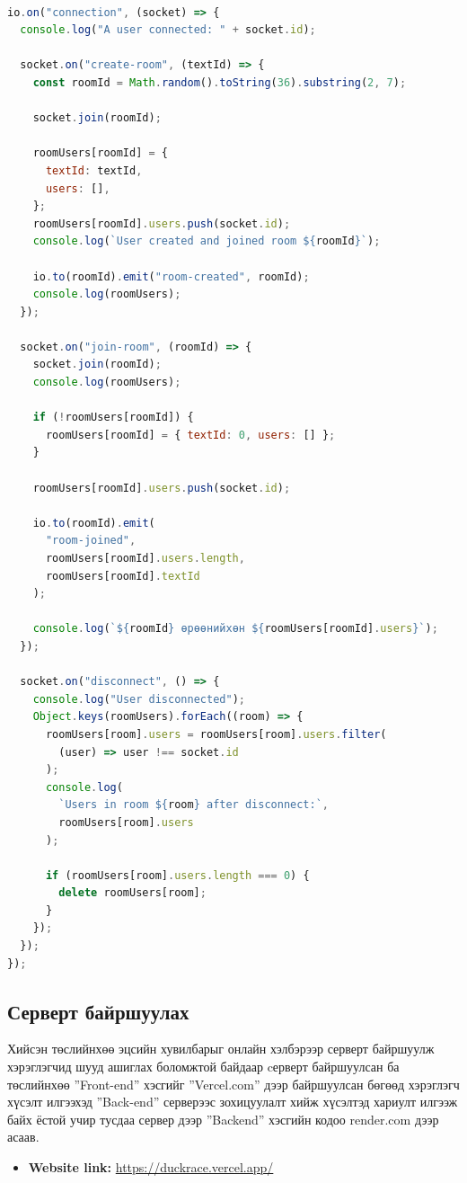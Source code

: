 \begin{lstlisting}[language=Javascript, caption=Socket ашиглан хэрэглэгчдийг зохицуулах, frame=single]
	
io.on("connection", (socket) => {
  console.log("A user connected: " + socket.id);

  socket.on("create-room", (textId) => {
    const roomId = Math.random().toString(36).substring(2, 7);

    socket.join(roomId);

    roomUsers[roomId] = {
      textId: textId,
      users: [],
    };
    roomUsers[roomId].users.push(socket.id);
    console.log(`User created and joined room ${roomId}`);

    io.to(roomId).emit("room-created", roomId);
    console.log(roomUsers);
  });

  socket.on("join-room", (roomId) => {
    socket.join(roomId);
    console.log(roomUsers);

    if (!roomUsers[roomId]) {
      roomUsers[roomId] = { textId: 0, users: [] };
    }

    roomUsers[roomId].users.push(socket.id);

    io.to(roomId).emit(
      "room-joined",
      roomUsers[roomId].users.length,
      roomUsers[roomId].textId
    );

    console.log(`${roomId} өрөөнийхөн ${roomUsers[roomId].users}`);
  });

  socket.on("disconnect", () => {
    console.log("User disconnected");
    Object.keys(roomUsers).forEach((room) => {
      roomUsers[room].users = roomUsers[room].users.filter(
        (user) => user !== socket.id
      );
      console.log(
        `Users in room ${room} after disconnect:`,
        roomUsers[room].users
      );

      if (roomUsers[room].users.length === 0) {
        delete roomUsers[room];
      }
    });
  });
});

\end{lstlisting}


\subsection{Серверт байршуулах}

Хийсэн төслийнхөө эцсийн хувилбарыг онлайн хэлбэрээр серверт байршуулж хэрэглэгчид шууд ашиглах боломжтой байдаар cерверт байршуулсан ба төслийнхөө ”Front-end” хэсгийг ”Vercel.com” дээр байршуулсан бөгөөд хэрэглэгч хүсэлт илгээхэд ”Back-end” серверээс зохицуулалт хийж хүсэлтэд хариулт илгээж байх ёстой учир тусдаа сервер дээр ”Backend” хэсгийн кодоо render.com дээр асаав.


\begin{itemize}
	\item \textbf{Website link:} \url{https://duckrace.vercel.app/}
\end{itemize}